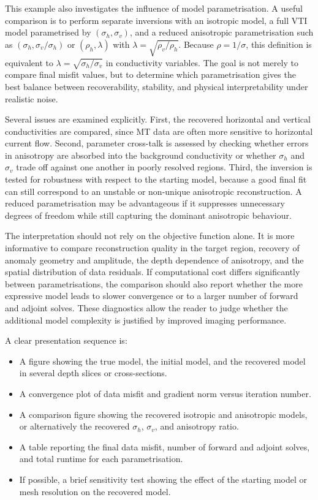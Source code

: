 \documentclass{article}
\begin{document}
This example also investigates the influence of model parametrisation. A useful comparison is to perform separate inversions with an isotropic model, a full VTI model parametrised by $(\sigma_h,\sigma_v)$, and a reduced anisotropic parametrisation such as $(\sigma_h,\sigma_v/\sigma_h)$ or $(\rho_h,\lambda)$ with $\lambda=\sqrt{\rho_v/\rho_h}$. Because $\rho=1/\sigma$, this definition is equivalent to $\lambda=\sqrt{\sigma_h/\sigma_v}$ in conductivity variables. The goal is not merely to compare final misfit values, but to determine which parametrisation gives the best balance between recoverability, stability, and physical interpretability under realistic noise.

Several issues are examined explicitly. First, the recovered horizontal and vertical conductivities are compared, since MT data are often more sensitive to horizontal current flow. Second, parameter cross-talk is assessed by checking whether errors in anisotropy are absorbed into the background conductivity or whether $\sigma_h$ and $\sigma_v$ trade off against one another in poorly resolved regions. Third, the inversion is tested for robustness with respect to the starting model, because a good final fit can still correspond to an unstable or non-unique anisotropic reconstruction. A reduced parametrisation may be advantageous if it suppresses unnecessary degrees of freedom while still capturing the dominant anisotropic behaviour.

The interpretation should not rely on the objective function alone. It is more informative to compare reconstruction quality in the target region, recovery of anomaly geometry and amplitude, the depth dependence of anisotropy, and the spatial distribution of data residuals. If computational cost differs significantly between parametrisations, the comparison should also report whether the more expressive model leads to slower convergence or to a larger number of forward and adjoint solves. These diagnostics allow the reader to judge whether the additional model complexity is justified by improved imaging performance.

A clear presentation sequence is:
\begin{itemize}
  \item A figure showing the true model, the initial model, and the recovered model in several depth slices or cross-sections.
  \item A convergence plot of data misfit and gradient norm versus iteration number.
  \item A comparison figure showing the recovered isotropic and anisotropic models, or alternatively the recovered $\sigma_h$, $\sigma_v$, and anisotropy ratio.
  \item A table reporting the final data misfit, number of forward and adjoint solves, and total runtime for each parametrisation.
  \item If possible, a brief sensitivity test showing the effect of the starting model or mesh resolution on the recovered model.
\end{itemize}
\end{document}
